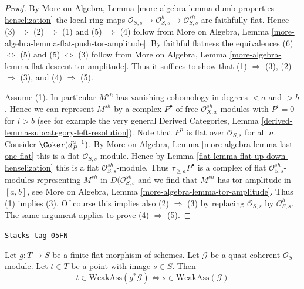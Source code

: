 \begin{proof}

By More on Algebra, Lemma
\ref{more-algebra-lemma-dumb-properties-henselization}
the local ring maps
$\mathcal{O}_{S, s} \to \mathcal{O}_{S, s}^h \to \mathcal{O}_{S, s}^{sh}$
are faithfully flat.
Hence (3) $\Rightarrow$ (2) $\Rightarrow$ (1) and
(5) $\Rightarrow$ (4) follow from
More on Algebra, Lemma \ref{more-algebra-lemma-flat-push-tor-amplitude}.
By faithful flatness the equivalences (6) $\Leftrightarrow$ (5) and
(5) $\Leftrightarrow$ (3) follow from
More on Algebra, Lemma \ref{more-algebra-lemma-flat-descent-tor-amplitude}.
Thus it suffices to show that
(1) $\Rightarrow$ (3), (2) $\Rightarrow$ (3), and (4) $\Rightarrow$ (5).

\medskip\noindent
Assume (1). In particular $M^{sh}$ has vanishing cohomology
in degrees $< a$ and $> b$. Hence we can represent $M^{sh}$ by a complex
$P^\bullet$ of free $\mathcal{O}_{X, x}^{sh}$-modules with
$P^i = 0$ for $i > b$
(see for example the very general
Derived Categories, Lemma \ref{derived-lemma-subcategory-left-resolution}).
Note that $P^n$ is flat over $\mathcal{O}_{S, s}$ for all $n$.
Consider $\Coker(d_P^{a - 1})$. By More on Algebra, Lemma
\ref{more-algebra-lemma-last-one-flat}
this is a flat $\mathcal{O}_{S, s}$-module.
Hence by Lemma \ref{flat-lemma-flat-up-down-henselization}
this is a flat $\mathcal{O}_{S, s}^{sh}$-module.
Thus $\tau_{\geq a}P^\bullet$ is a complex of
flat $\mathcal{O}_{S, s}^{sh}$-modules representing $M^{sh}$
in $D(\mathcal{O}_{S, s}^{sh}$ and we find that
$M^{sh}$ has tor amplitude in $[a, b]$, see
More on Algebra, Lemma \ref{more-algebra-lemma-tor-amplitude}.
Thus (1) implies (3). Of course this implies also
(2) $\Rightarrow$ (3) by replacing $\mathcal{O}_{S, s}$ by
$\mathcal{O}_{S, s}^h$. The same argument applies to prove
(4) $\Rightarrow$ (5).
\end{proof}

\begin{lemma}
\label{flat-lemma-finite-flat-weak-assassin-up-down}
\href{https://stacks.math.columbia.edu/tag/05FN}{\texttt{Stacks tag 05FN}}

Let $g : T \to S$ be a finite flat morphism of schemes.
Let $\mathcal{G}$ be a quasi-coherent $\mathcal{O}_S$-module.
Let $t \in T$ be a point with image $s \in S$. Then
$$
t \in \text{WeakAss}(g^*\mathcal{G})
\Leftrightarrow
s \in \text{WeakAss}(\mathcal{G})
$$
\end{lemma}

